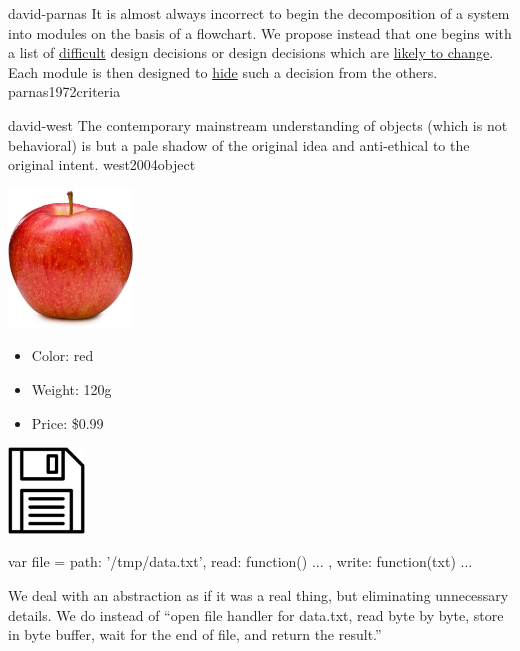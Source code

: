 \documentclass{article}
\begin{document}

\lnQuote
  {david-parnas}
  {It is almost always incorrect to begin the decomposition of a system into modules on the basis of a flowchart. We propose instead that one begins with a list of \ul{difficult} design decisions or design decisions which are \ul{likely to change}. Each module is then designed to \ul{hide} such a decision from the others.}
  {parnas1972criteria}

\lnQuote
  {david-west}
  {The contemporary mainstream understanding of objects (which is not behavioral) is but a pale shadow of the original idea and anti-ethical to the original intent.}
  {west2004object}



\begin{pptWide}{2}
\includegraphics[width=1.3in]{apple.jpg}
\begin{itemize}
\item Color: red
\item Weight: 120g
\item Price: \$0.99
\end{itemize}
\par\columnbreak\par
\includegraphics[width=0.8in]{file-on-disc.jpg}
\par
{\small\begin{ffcode}
var file = {
  path: '/tmp/data.txt',
  read: function() { ... },
  write: function(txt) { ... }
}
\end{ffcode}
}
\end{pptWide}
We deal with an abstraction as if it was a real thing, but eliminating unnecessary details.
We do  instead of ``open file handler for data.txt, read byte by byte, store in
byte buffer, wait for the end of file, and return the result.''
\plush{}
\end{document}
